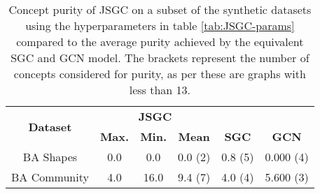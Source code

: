 \begin{table}[h]
    \centering
    \captionsetup{width=.9\textwidth}
    \begin{tabular}{c|ccc|cc}
        \multirow{2}{*}{\textbf{Dataset}} &
        \multicolumn{3}{c|}{\textbf{JSGC}} & \\
        & \textbf{Max.} & \textbf{Min.} & \textbf{Mean} & 
        \multirow{-2}{*}{\textbf{SGC}} &
        \multirow{-2}{*}{\textbf{GCN}}\\
        \midrule
        BA Shapes       & 0.0 & 0.0 & 0.0 (2) & 0.8 (5) & 0.000 (4) \\
        BA Community    & 4.0 & 16.0 & 9.4 (7) & 4.0 (4) & 5.600 (3) \\
    \end{tabular}
    \caption{Concept purity of JSGC on a subset of the synthetic datasets using the hyperparameters in table \ref{tab:JSGC-params} compared to the average purity achieved by the equivalent SGC and GCN model. The brackets represent the number of concepts considered for purity, as per  these are graphs with less than 13.}
    \label{tab:JSGC-purity}
\end{table}

